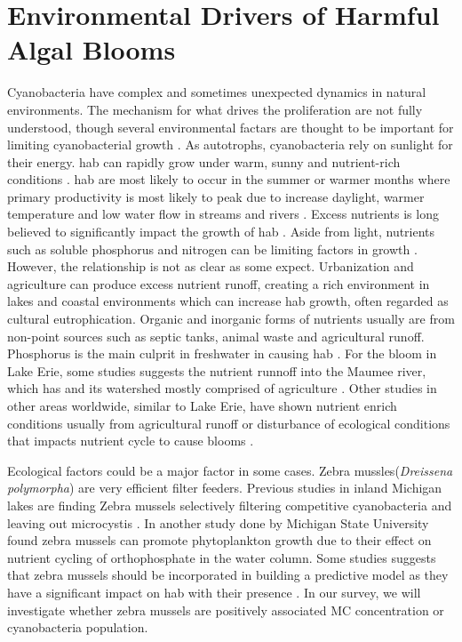 \section{Environmental Drivers of Harmful Algal Blooms}
Cyanobacteria have complex and sometimes unexpected dynamics in natural environments. The mechanism for what drives the proliferation are not fully understood, though several environmental factars are thought to be important for limiting cyanobacterial growth \cite{dittmann_cyanobacterial_2012, noauthor_human_2012}. As autotrophs, cyanobacteria rely on sunlight for their energy. \gls{hab} can rapidly grow under warm, sunny and nutrient-rich conditions \cite{rastogi_cyanotoxin-microcystins:_2014}. \gls{hab} are most likely to occur in the summer or warmer months where primary productivity is most likely to peak due to increase daylight, warmer temperature and low water flow in streams and rivers \cite{vannote_river_1980,chapra_climate_2017-2}.
Excess nutrients is long believed to significantly impact the growth of \gls{hab} \cite{anderson_harmful_2002,anderson_harmful_2002}. Aside from light, nutrients such as soluble phosphorus and nitrogen can be limiting factors in growth \cite{tilman_phytoplankton_1982}. However, the relationship is not as clear as some expect. Urbanization and agriculture can produce excess nutrient runoff, creating a rich environment in lakes and coastal environments which can increase \gls{hab} growth, often regarded as cultural eutrophication\cite{smith_eutrophication_2009}.  Organic and inorganic forms of nutrients  usually are from non-point sources such as septic tanks, animal waste and agricultural runoff. Phosphorus is the main culprit in freshwater in causing \gls{hab} \cite{anderson_harmful_2002}. For the bloom in Lake Erie, some studies suggests the nutrient runnoff into the  Maumee river, which has and its watershed mostly comprised of agriculture \cite{michalak_record-setting_2013, chaffin_accuracy_2018}. Other studies in other areas worldwide, similar to Lake Erie, have shown nutrient enrich conditions usually from agricultural runoff or disturbance of ecological conditions that impacts nutrient cycle to cause blooms \cite{ahn_evaluation_2011, ahn_rainfall_2002, anderson_harmful_2002, jiang_statistical_2008}.

Ecological factors could be a major factor in some cases. Zebra mussles(\emph{Dreissena polymorpha}) are very efficient filter feeders. Previous studies in inland Michigan lakes are finding Zebra mussels selectively filtering competitive cyanobacteria and leaving out microcystis \cite{vanderploeg_zebra_2001}. In another study done by Michigan State University \cite{raikow_dominance_2004} found zebra mussels can promote phytoplankton growth due to their effect on nutrient cycling of orthophosphate in the water column. Some studies suggests that zebra mussels should be incorporated in building a predictive model as they have a significant impact on \gls{hab} with their presence \cite{lavrentyev_effects_1995, knoll_invasive_2008, raikow_dominance_2004}.   In our survey, we will investigate whether zebra mussels are positively associated MC concentration or cyanobacteria population.

